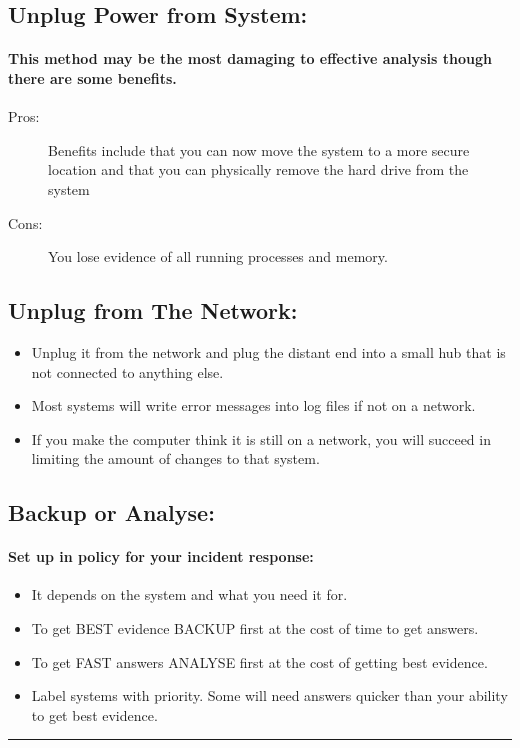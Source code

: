 \documentclass[british]{article}
\begin{document}
\subsection{Unplug Power from System:}

\paragraph{This method may be the most damaging to effective analysis though
there are some benefits.}
\begin{description}
\item [{Pros:}] Benefits include that you can now move the system to a
more secure location and that you can physically remove the hard drive
from the system
\item [{Cons:}] You lose evidence of all running processes and memory.
\end{description}

\subsection{Unplug from The Network:}
\begin{itemize}
\item Unplug it from the network and plug the distant end into a small hub
that is not connected to anything else.
\item Most systems will write error messages into log files if not on a
network.
\item If you make the computer think it is still on a network, you will
succeed in limiting the amount of changes to that system.
\end{itemize}

\subsection{Backup or Analyse:}

\paragraph{Set up in policy for your incident response:}
\begin{itemize}
\item It depends on the system and what you need it for.
\item To get BEST evidence BACKUP first at the cost of time to get answers.
\item To get FAST answers ANALYSE first at the cost of getting best evidence.
\item Label systems with priority. Some will need answers quicker than your
ability to get best evidence.
\end{itemize}
\rule[0.5ex]{0.75\columnwidth}{1pt}
\end{document}
